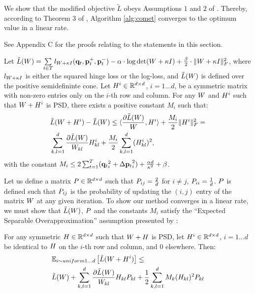 \documentclass{article}
\begin{document}
We show that the modified objective $\tilde{L}$ obeys Assumptions $1$ and $2$ of \citet{richtarik2013optimal}. Thereby, according to Theorem 3 of \citeauthor{richtarik2013optimal}, Algorithm \ref{alg:comet} converges to the optimum value in a linear rate.

See Appendix C for the proofs relating to the statements in this section.
\begin{lemma}
\label{lem:smooth}
Let 
$\tilde{L}({W})=\sum\limits_{t\in T}{l_{{W} + \kappa I}(\mathbf{q}_t, \mathbf{p}_{t}^{+}, \mathbf{p}_{t}^{-})} -
\alpha \cdot \log \det({W} + \kappa I) + \tfrac{\beta}{2}  \cdot \| {W} + \kappa I \|_{F}^{2}$, 
where $l_{{W} + \kappa I}$ is either the squared hinge loss or the log-loss, and $\tilde{L}({W})$ is defined over the positive semidefininte cone. 
Let ${H}^i \in \mathbb{R}^{d \times d}$, $i=1 \ldots d$, be a symmetric matrix with non-zero entries only on the $i$-th row and column.
For any ${W}$ and ${H}^i$ such that ${W} + {H}^i$ is PSD, there exists a positive constant $M_i$ such that:
\begin{align}
\label{eq:ineq}
&\tilde{L}({W} + {H}^i) - \tilde{L}({W}) \leq  \langle \frac{\partial \tilde{L}({W})}{{W}}, {H}^i \rangle + \frac{M_i}{2} {\|{H}^i\|_F^2} = \\
& \sum_{k,l=1}^d  \frac{\partial \tilde{L}({W})}{{W}_{kl}} {H}_{kl}^i + \frac{M_i}{2} \sum_{k,l=1}^d  ({H}_{kl}^i)^2, \nonumber
\end{align}
with the constant $M_i \leq  2 \sum_{t=1}^T ({{\mathbf{q}}_{{t}}}_i^2 +{\Delta\mathbf{p}_{t}}_i^2) + \frac{\alpha d}{\kappa ^2} + \beta$.
\end{lemma}

Let us define a matrix ${P} \in \mathbb{R}^{d \times d}$ such that ${P}_{ij} = \frac{2}{d}$ for $i \ne j$, ${P}_{ii} = \frac{1}{d}$. ${P}$ is defined such that ${P}_{ij}$ is the probability of updating the $(i,j)$ entry of the matrix ${W}$ at any given iteration. To show our method converges in a linear rate, we must show that $\tilde{L}({W})$, ${P}$ and the constants $M_i$ satisfy the ``Expected Separable Overapproximation'' assumption presented by \citet{richtarik2013optimal}:

\begin{lemma}\label{lem:ESO}
For any symmetric ${H} \in \mathbb{R}^{d \times d}$ such that ${W} + {H}$ is PSD, let ${H}^i \in \mathbb{R}^{d \times d}$, $i=1 \ldots d$ be identical to ${H}$  on the $i$-th row and column, and $0$ elsewhere. Then:
\begin{align*}
&\mathbb{E}_{i \sim uniform 1 \ldots d} \left[ \tilde{L}({W} + {H}^i) \right] \leq \\
&\tilde{L}({W}) + \sum_{k,l=1}^d  \frac{\partial \tilde{L}({W})}{{W}_{kl}} {H}_{kl} {P}_{kl} + \frac{1}{2} \sum_{k,l=1}^d   M_k ({H}_{kl})^2 {P}_{kl}
\end{align*}
\end{lemma}
\end{document}

